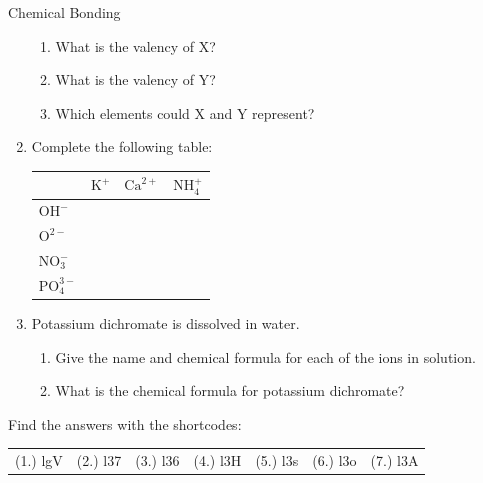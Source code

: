 \begin{eocexercises}{Chemical Bonding}
\begin{enumerate}[noitemsep, label=\textbf{\arabic*}. ]
 \label{m38689*id148261}\begin{enumerate}[noitemsep, label=\textbf{\alph*}. ] 
            \label{m38689*uid181}\item What is the valency of $\mathrm{X}$?
\label{m38689*uid182}\item What is the valency of $\mathrm{Y}$?
\label{m38689*uid183}\item Which elements could $\mathrm{X}$ and $\mathrm{Y}$ represent?
\end{enumerate}
\item Complete the following table:
\begin{table}[H]
\begin{center}
 \begin{tabular}{|l|l|l|l|} \hline
  & \textbf{$\text{K}^{+}$} & \textbf{$\text{Ca}^{2+}$} & \textbf{$\text{NH}_{4}^{+}$} \\ \hline
\textbf{$\text{OH}^{-}$} & & & \\ \hline   
\textbf{$\text{O}^{2-}$} & & & \\ \hline   
\textbf{$\text{NO}_{3}^{-}$} & & & \\ \hline   
\textbf{$\text{PO}_{4}^{3-}$} & & & \\ \hline   
 \end{tabular}
\end{center}
\end{table}
              \label{m38689*uid185}\item Potassium dichromate is dissolved in water.
\label{m38689*id148361}\begin{enumerate}[noitemsep, label=\textbf{\alph*}. ] 
            \label{m38689*uid186}\item Give the name and chemical formula for each of the ions in solution.
\label{m38689*uid187}\item What is the chemical formula for potassium dichromate?
\end{enumerate}
                \end{enumerate}
  \label{m38689**end}
  \label{6cd7661dc7a31822d94f8eef4ac8e3a5**end}
\par {} Find the answers with the shortcodes:
 \par \begin{tabular}[h]{cccccc}
 (1.) lgV  &  (2.) l37  &  (3.) l36  &  (4.) l3H  &  (5.) l3s  &  (6.) l3o  &  (7.) l3A  & \end{tabular}
\end{eocexercises}
